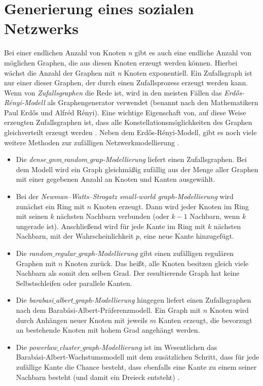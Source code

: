 \section{Generierung eines sozialen Netzwerks} 
Bei einer endlichen Anzahl von Knoten \textit{n} gibt es auch eine endliche Anzahl von möglichen Graphen, die aus diesen Knoten erzeugt werden können. Hierbei wächst die Anzahl der Graphen mit \textit{n} Knoten exponentiell.
Ein Zufallsgraph ist nur einer dieser Graphen, der durch einen Zufallsprozess erzeugt werden kann.
Wenn von \textit{Zufallsgraphen} die Rede ist, wird in den meisten Fällen das \textit{Erdős-Rényi-Modell} als Graphengenerator verwendet (benannt nach den Mathematikern Paul Erdős und Alfréd Rényi). Eine wichtige Eigenschaft von, auf diese Weise erzeugten Zufallsgraphen ist, dass alle Konstellationsmöglichkeiten des Graphen gleichverteilt erzeugt werden \cite{Generators}.
Neben dem Erdős-Rényi-Modell, gibt es noch viele weitere Methoden zur zufälligen Netzwerkmodellierung \cite{Generators}.
\begin{itemize}
    \item Die \textit{dense$\_$gnm$\_$random$\_$grap-Modellierung} liefert einen Zufallsgraphen.
    Bei dem Modell wird ein Graph gleichmäßig zufällig aus der Menge aller Graphen mit einer gegebenen Anzahl an Knoten und Kanten ausgewählt.
    \item Bei der \textit{Newman–Watts–Strogatz small-world graph-Modellierung} wird zunächst ein Ring mit $n$ Knoten erzeugt. Dann wird jeder Knoten im Ring mit seinen $k$ nächsten Nachbarn verbunden (oder $k - 1$ Nachbarn, wenn $k$ ungerade ist). Anschließend wird für jede Kante im Ring mit $k$ nächsten Nachbarn, mit der Wahrscheinlichkeit $p$, eine neue Kante hinzugefügt.
    \item Die \textit{random$\_$regular$\_$graph-Modellierung} gibt einen zufälligen regulären Graphen mit $n$ Knoten zurück. Das heißt, alle Knoten besitzen gleich viele Nachbarn als somit den selben Grad.
    Der resultierende Graph hat keine Selbstschleifen oder parallele Kanten.
    \item Die \textit{barabasi$\_$albert$\_$graph-Modellierung} hingegen liefert einen Zufallsgraphen nach dem Barabási-Albert-Präferenzmodell.
    Ein Graph mit $n$ Knoten wird durch Anhängen neuer Knoten mit jeweils $m$ Kanten erzeugt, die bevorzugt an bestehende Knoten mit hohem Grad angehängt werden.
    \item Die \textit{powerlaw$\_$cluster$\_$graph-Modellierung} ist im Wesentlichen das\\ Barabási-Albert-Wachstumsmodell mit dem zusätzlichen Schritt, dass für jede zufällige Kante die Chance besteht, dass ebenfalls eine Kante zu einem seiner Nachbarn besteht (und damit ein Dreieck entsteht) \cite{Generators}.
\end{itemize}

